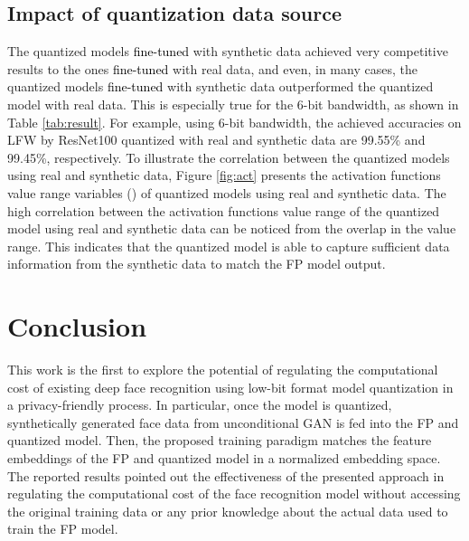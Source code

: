 \documentclass[a4paper,conference]{IEEEtran}
\begin{document}
\vspace{-1mm}
\subsection{Impact of quantization data source}
\label{sec:data_source}
\vspace{-1mm}
The quantized models \textcolor{black}{fine-tuned} with synthetic data achieved very competitive results to the ones \textcolor{black}{fine-tuned} with real data, and even, in many cases, the quantized models \textcolor{black}{fine-tuned} with synthetic data outperformed the quantized model with real data. This is especially true for the 6-bit bandwidth, as shown in Table \ref{tab:result}. For example, using 6-bit bandwidth, the achieved accuracies on LFW by ResNet100 quantized with real and synthetic data are 99.55\% and 99.45\%, respectively.
To illustrate the correlation between the quantized models using real and synthetic data, Figure \ref{fig:act} presents the activation functions value range variables () of quantized models using real and synthetic data. The high correlation between the activation functions value range of the quantized model using real and synthetic data can be noticed from the overlap in the value range. This indicates that the quantized model is able to capture sufficient data information from the synthetic data to match the FP model output.




























\vspace{-1mm}
\section{Conclusion}
\label{sec:conc}
\vspace{-1mm}
This work is the first to explore the potential of regulating the computational cost of existing deep face recognition using low-bit format model quantization in a privacy-friendly process.
In particular, once the model is quantized, synthetically generated face data from unconditional GAN is fed into the FP and quantized model. 
Then, the proposed training paradigm matches the feature embeddings of the FP and quantized model in a normalized embedding space. 
The reported results pointed out the effectiveness of the presented approach in regulating the computational cost of the face recognition model without accessing the original training data or any prior knowledge about the actual data used to train the FP model. 
\end{document}
